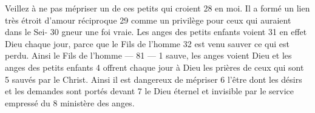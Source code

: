 Veillez à ne pas mépriser un de ces petits qui croient	 
28	 	en moi. Il a formé un lien très étroit d'amour réciproque	 
29	 	comme un privilège pour ceux qui auraient dans le Sei-	 
30	 	gneur une foi vraie. Les anges des petits enfants voient	 
31	 	en effet Dieu chaque jour, parce que le Fils de l'homme	 
32	 	est venu sauver ce qui est perdu. Ainsi le Fils de l'homme	 
 	--- 81 ---	 
1	 	sauve, les anges voient Dieu et les anges des petits enfants	 	 
4	 	offrent chaque jour à Dieu les prières de ceux qui sont	 
5	 	sauvés par le Christ. Ainsi il est dangereux de mépriser	 
6	 	l'être dont les désirs et les demandes sont portés devant	 
7	 	le Dieu éternel et invisible par le service empressé du	 
8	 	ministère des anges.